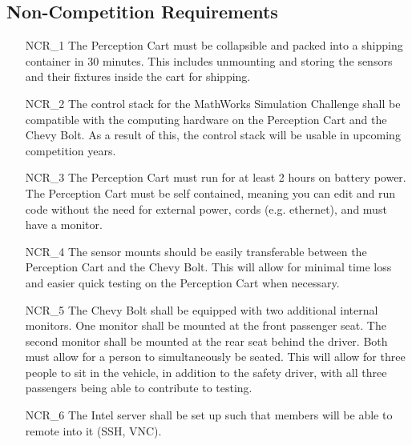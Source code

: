 \documentclass[12pt]{article}
\begin{document}
\subsection{Non-Competition Requirements}
\begin{itemize}
    \item[NCR\_1] The Perception Cart must be collapsible and packed into a shipping container in 30 minutes. This includes unmounting and storing the sensors and their fixtures inside the cart for shipping.
    \item[NCR\_2] The control stack for the MathWorks Simulation Challenge shall be compatible with the computing hardware on the Perception Cart and the Chevy Bolt. As a result of this, the control stack will be usable in upcoming competition years.
    \item[NCR\_3] The Perception Cart must run for at least 2 hours on battery power. The Perception Cart must be self contained, meaning you can edit and run code without the need for external power, cords (e.g. ethernet), and must have a monitor.
    \item[NCR\_4] The sensor mounts should be easily transferable between the Perception Cart and the Chevy Bolt. This will allow for minimal time loss and easier quick testing on the Perception Cart when necessary.
    \item[NCR\_5] The Chevy Bolt shall be equipped with two additional internal monitors. One monitor shall be mounted at the front passenger seat. The second monitor shall be mounted at the rear seat behind the driver. Both must allow for a person to simultaneously be seated. This will allow for three people to sit in the vehicle, in addition to the safety driver, with all three passengers being able to contribute to testing.
    \item[NCR\_6] The Intel server shall be set up such that members will be able to remote into it (SSH, VNC).
\end{itemize}

\end{document}
